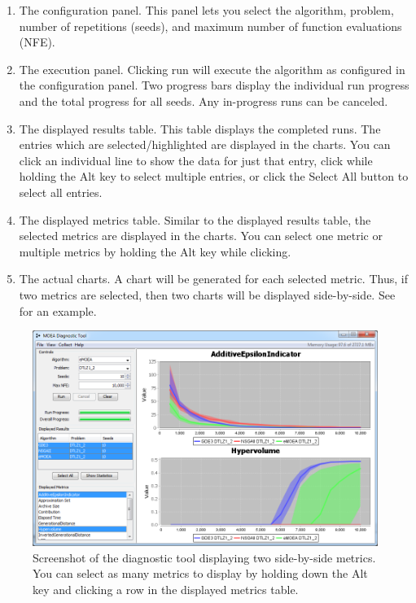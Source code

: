 \begin{enumerate}
  \item The configuration panel.  This panel lets you select the algorithm, problem, number of repetitions (seeds), and maximum number of function evaluations (NFE).
  \item The execution panel.  Clicking run will execute the algorithm as configured in the configuration panel.  Two progress bars display the individual run progress and the total progress for all seeds.  Any in-progress runs can be canceled.
  \item The displayed results table.  This table displays the completed runs.  The entries which are selected/highlighted are displayed in the charts.  You can click an individual line to show the data for just that entry, click while holding the Alt key to select multiple entries, or click the Select All button to select all entries.
  \item The displayed metrics table.  Similar to the displayed results table, the selected metrics are displayed in the charts.  You can select one metric or multiple metrics by holding the Alt key while clicking.
  \item The actual charts.  A chart will be generated for each selected metric.  Thus, if two metrics are selected, then two charts will be displayed side-by-side.  See  for an example.
\end{enumerate}

\begin{figure}
  \includegraphics[width=\linewidth]{diagnosticToolMultiselect.png}
  \caption{Screenshot of the diagnostic tool displaying two side-by-side metrics.  You can select as many metrics to display by holding down the Alt key and clicking a row in the displayed metrics table.}
  \label{fig:diagnosticToolMultiselect}
\end{figure}


